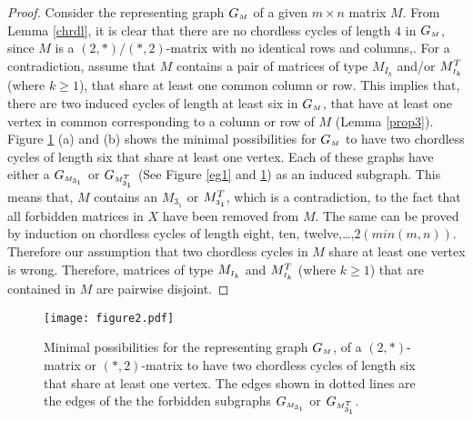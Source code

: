 \documentclass[review, 1p]{elsarticle}
\begin{document}
\begin{proof}
Consider the representing graph $G_{\mathsmaller{M}}$ of a given $m \times n$ matrix $M$. From Lemma \ref{chrdl}, it is clear that there are no chordless cycles of length $4$ in $G_{\mathsmaller{M}}$, since $M$ is a $(2,*)/(*,2)$-matrix with no identical rows and columns,. For a contradiction, assume that $M$ contains a pair of matrices of type $M_{I_{k}}$ and/or $M^{T}_{\mathsmaller{I_{k}}}$ (where $k \geq 1$), that share at least one common column or row. This implies that, there are two induced cycles of length at least six in $G_{\mathsmaller{M}}$, that have at least one vertex in common corresponding to a column or row of $M$ (Lemma \ref{prop3}). Figure \ref{chrd2} (a) and (b) shows the minimal possibilities for $G_{\mathsmaller{M}}$ to have two chordless cycles of length six that share at least one vertex. Each of these graphs have either a $G_{\mathsmaller{M}_{3_{1}}}$ or ${G_{\mathsmaller{M}_{3_{1}}^{\tiny T}}}$ (See Figure \ref{eg1} and \ref{chrd2})  as an induced subgraph. This means that, $M$ contains an $M_{3_{1}}$ or ${M^{T}_{\mathsmaller 3_{1}}}$, which is a contradiction, to the fact that all forbidden matrices in $X$ have been removed from $M$. The same can be proved by induction on chordless cycles of length eight, ten, twelve,\ldots,$2(min(m,n))$. Therefore our  assumption that two chordless cycles in $M$ share at least one vertex is wrong. Therefore, matrices of type $M_{\mathsmaller I_{k}}$ and $M^{T}_{\mathsmaller{I_{k}}}$ (where $k \geq 1$) that are contained in $M$ are pairwise disjoint.  
\end{proof}
\begin{figure}[t]
\centering
 \texttt{[image: figure2.pdf]}
  \caption{Minimal possibilities for the representing graph $G_{\mathsmaller{M}}$, of a $(2,*)$-matrix or $(*,2)$-matrix  to have two chordless cycles of length six that share at least one vertex. The edges shown in dotted lines are the edges of the the forbidden subgraphs $G_{\mathsmaller{M}_{3_{1}}}$ or ${G_{\mathsmaller{M}_{3_{1}}^{\tiny T}}}$. \label{chrd2}}
\end{figure}
\end{document}
